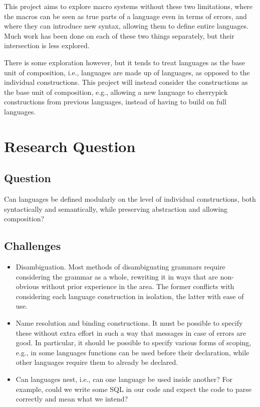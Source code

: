 \documentclass[10pt,a4paper]{article}
\begin{document}
This project aims to explore macro systems without these two limitations, where the macros can be seen as true parts of a language even in terms of errors, and where they can introduce new syntax, allowing them to define entire languages. Much work has been done on each of these two things separately, but their intersection is less explored.

There is some exploration however, but it tends to treat languages as the base unit of composition, i.e., languages are made up of languages, as opposed to the individual constructions. This project will instead consider the constructions as the base unit of composition, e.g., allowing a new language to cherrypick constructions from previous languages, instead of having to build on full languages.

\section{Research Question}

\subsection{Question}
Can languages be defined modularly on the level of individual constructions, both syntactically and semantically, while preserving abstraction and allowing composition?

\subsection{Challenges}
\begin{itemize}
\item Disambiguation. Most methods of disambiguating grammars require considering the grammar as a whole, rewriting it in ways that are non-obvious without prior experience in the area. The former conflicts with considering each language construction in isolation, the latter with ease of use.

\item Name resolution and binding constructions. It must be possible to specify these without extra effort in such a way that messages in case of errors are good. In particular, it should be possible to specify various forms of scoping, e.g., in some languages functions can be used before their declaration, while other languages require them to already be declared.

\item Can languages nest, i.e., can one language be used inside another? For example, could we write some SQL in our code and expect the code to parse correctly and mean what we intend?
\end{itemize}
\end{document}
